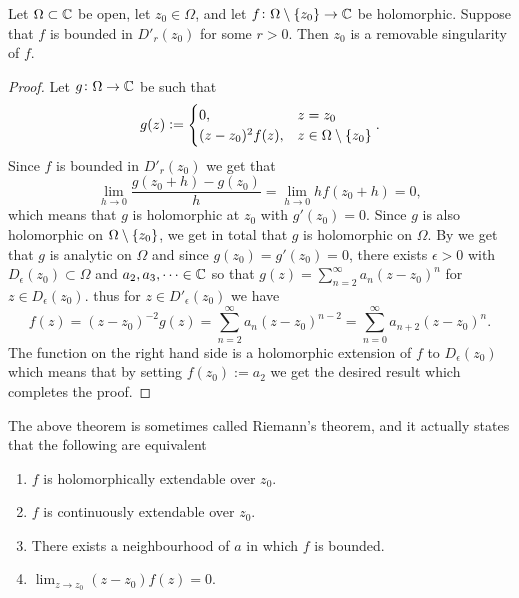 \documentclass[11pt,a4paper]{article}
\begin{document}
\begin{theorem}
  \label{thm:riemann-removable-singularity}
  Let $\Omega \subset \mathbb{C}$ be open,
  let $z_0 \in \Omega$,
  and let $f \colon \Omega \setminus \left\{z_0\right\} \to \mathbb{C}$ be holomorphic.
  Suppose that $f$ is bounded in $D'_r(z_0)$ for some $r > 0$.
  Then $z_0$ is a removable singularity of $f$.
\end{theorem}
\begin{proof}
  Let $g \colon \Omega \to \mathbb{C}$ be such that
  \[
    g(z) :=
    \begin{cases}
      0, &z = z_0 \\
      (z - z_0)^2 f(z), &z \in \Omega \setminus \left\{z_0\right\}
    \end{cases}.
  \]
  Since $f$ is bounded in $D'_r(z_0)$ we get that
  \[
    \lim_{h \to 0} \frac{g(z_0 + h) - g(z_0)}{h} =
    \lim_{h \to 0} h f(z_0 + h) = 0,
  \]
  which means that $g$ is holomorphic at $z_0$ with $g'(z_0) = 0$.
  Since $g$ is also holomorphic on $\Omega \setminus \left\{z_0\right\}$,
  we get in total that $g$ is holomorphic on $\Omega$.
  By  we get that $g$ is analytic
  on $\Omega$ and since $g(z_0) = g'(z_0) = 0$, there exists $\epsilon > 0$
  with $D_{\epsilon}(z_0) \subset \Omega$ and $a_2,a_3,\dots \in \mathbb{C}$ so
  that $g(z) = \sum_{n=2}^{\infty} a_n (z - z_0)^n$ for
  $z \in D_{\epsilon}(z_0)$.
  thus for $z \in D'_{\epsilon}(z_0)$ we have
  \[
    f(z) =
    (z - z_0)^{-2} g(z) =
    \sum_{n=2}^{\infty} a_n (z - z_0)^{n-2} =
    \sum_{n=0}^{\infty} a_{n+2} (z - z_0)^{n}.
  \]
  The function on the right hand side is a holomorphic extension of $f$ to
  $D_{\epsilon}(z_0)$ which means that by setting $f(z_0) := a_2$
  we get the desired result which completes the proof.
\end{proof}
\begin{remark}
  The above theorem is sometimes called Riemann's theorem,
  and it actually states that the following are equivalent
  \begin{enumerate}
    \item[(1)] $f$ is holomorphically extendable over $z_0$.
    \item[(2)] $f$ is continuously extendable over $z_0$.
    \item[(3)] There exists a neighbourhood of $a$ in which $f$ is bounded.
    \item[(4)] $\lim_{z \to z_0} (z - z_0) f(z) = 0$.
  \end{enumerate}
\end{remark}
\end{document}

